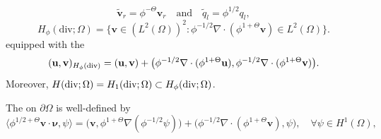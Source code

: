 \documentclass[usenames,dvipsnames,letterpaper,landscape,final]{slides}
\def\div{\nabla\cdot}
\def\Div{\text{\rm div}}
\begin{document}
\begin{myslide}

\newline
\begin{equation*}\label{eq:scaledVariables}
	\tilde{\mathbf{v}}_r = \phi^{-\Theta}\mathbf{v}_r
	\quad\text{and}\quad
	\tilde{q}_l = \phi^{1/2}q_l,
\end{equation*}
\newline
\begin{equation*}\label{eq:scaledHspace}
		  H_{\phi}(\text{div}; \Omega) = \Big\{ \mathbf{v} 
		  \in (L^2(\Omega))^2: \phi^{-1/2}\nabla \cdot (\phi^{1+\Theta} \mathbf{v})
		  \in L^2(\Omega) \Big\}.
\end{equation*}
		  equipped with the 
\begin{equation*}
(\mathbf{u},\mathbf{v})_{H_\phi(\Div)} = (\mathbf{u},\mathbf{v}) + \big(\phi^{-1/2}\div(\phi^{1+\Theta}\mathbf{u}),\phi^{-1/2}\div(\phi^{1+\Theta}\mathbf{v})\big).
\end{equation*}\vspace*{-20pt}\newline
Moreover, $H(\Div;\Omega) = H_1(\Div;\Omega) \subset H_\phi(\Div;\Omega)$.

\bigskip
The  on $\partial \Omega$ is well-defined by
		  \begin{equation*}\label{eq:scaledtraceoperator}
		  \langle \phi^{1/2+\Theta} \mathbf{v}\cdot \pmb{\nu}, \psi \rangle = \big(\mathbf{v}, \phi^{1+\Theta}\nabla(\phi^{-1/2}\psi)\big) + 
		  \big(\phi^{-1/2}\nabla \cdot (\phi^{1+\Theta}\mathbf{v}),\psi \big), \quad \forall \psi \in H^1(\Omega),
\end{equation*}

\end{myslide}

%
%
\end{document}
